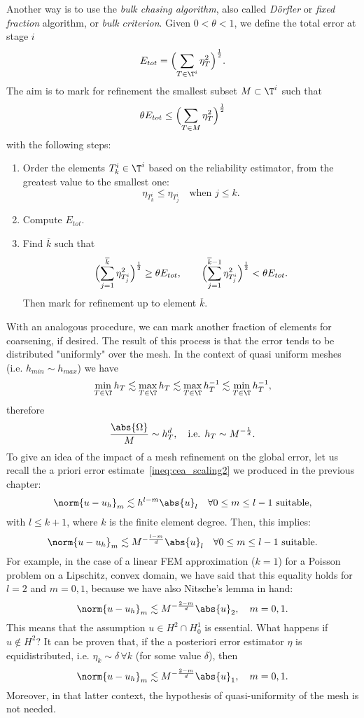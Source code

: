 Another way is to use the \emph{bulk chasing algorithm}, also called \emph{D\"{o}rfler} or \emph{fixed fraction} algorithm, or \emph{bulk criterion}. Given $0<\theta<1$, we define the total error at stage $i$
\[
E_{tot} = \Bigl( \sum_{T \in \T^i} \eta_T^2 \Bigr)^\frac{1}{2}.
\]
The aim is to mark for refinement the smallest subset $M \subset \T^i$ such that
\[
\theta E_{tot} \le \Bigl( \sum_{T \in M} \eta_T^2 \Bigr)^\frac{1}{2}
\]
with the following steps:
\begin{enumerate}
    \item Order the elements $T^i_k \in \T^i$ based on the reliability estimator, from the greatest value to the smallest one:
    \[
    \eta_{T^i_k} \le \eta_{T^i_j} \quad \text{when } j \le k.
    \]
    \item Compute $E_{tot}$.
    \item Find $\overline{k}$ such that
    \[
    \Bigl( \sum_{j=1}^{\overline{k}} \eta_{T^i_j}^2 \Bigr)^\frac{1}{2} \ge \theta E_{tot}, \qquad \Bigl( \sum_{j=1}^{\overline{k}-1} \eta_{T^i_j}^2 \Bigr)^\frac{1}{2} < \theta E_{tot}.
    \]
    Then mark for refinement up to element $\overline{k}$.
\end{enumerate}
With an analogous procedure, we can mark another fraction of elements for coarsening, if desired. The result of this process is that the error tends to be distributed "uniformly" over the mesh. In the context of quasi uniform meshes (i.e. $h_{min} \sim h_{max}$) we have
\[
\min_{T \in \T} h_T \lesssim \max_{T \in \T} h_T \lesssim \max_{T \in \T} h_T^{-1}
\lesssim \min_{T \in \T} h_T^{-1},
\]
therefore
\[
\frac{\abs{\Omega}}{M} \sim h_T^d, \quad \text{i.e. } h_T \sim M^{-\frac{1}{d}}.
\]
To give an idea of the impact of a mesh refinement on the global error, let us recall the a priori error estimate~\eqref{ineq:cea_scaling2} we produced in the previous chapter:
\[
\norm{u-u_h}_m \lesssim h^{l-m} \abs{u}_{l} \quad \forall 0\le m \le l-1 \text{ suitable},
\]
with $l \le k+1$, where $k$ is the finite element degree.
Then, this implies:
\[
\norm{u-u_h}_m \lesssim M^{-\frac{l-m}{d}} \abs{u}_{l} \quad \forall 0\le m \le l-1 \text{ suitable}.
\]
For example, in the case of a linear FEM approximation ($k=1$) for a Poisson problem on a Lipschitz, convex domain, we have said that this equality holds for $l=2$ and $m=0,1$, because we have also Nitsche's lemma in hand:
\[
\norm{u-u_h}_m \lesssim M^{-\frac{2-m}{d}} \abs{u}_{2}, \quad m=0,1.
\]
This means that the assumption $u \in H^2 \cap H^1_0$ is essential. What happens if $u \not\in H^2$? It can be proven that, if the a posteriori error estimator $\eta$ is equidistributed, i.e. $\eta_k \sim \delta \, \forall k$ (for some value $\delta$), then
\[
\norm{u-u_h}_m \lesssim M^{-\frac{2-m}{d}} \abs{u}_{1}, \quad m=0,1.
\]
Moreover, in that latter context, the hypothesis of quasi-uniformity of the mesh is not needed.

